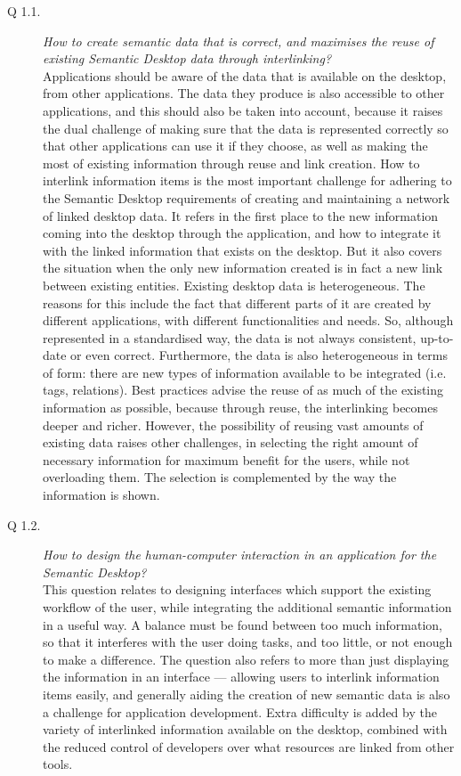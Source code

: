 \begin{description}
 \item[Q 1.1.] \emph{How to create semantic data that is correct, and maximises the reuse of existing Semantic Desktop data through interlinking?}\\
Applications should be aware of the data that is available on the desktop, from other applications. The data they produce is also accessible to other applications, and this should also be taken into account, because it raises the dual challenge of making sure that the data is represented correctly so that other applications can use it if they choose, as well as making the most of existing information through reuse and link creation. How to interlink information items is the most important challenge for adhering to the Semantic Desktop requirements of creating and maintaining a network of linked desktop data. It refers in the first place to the new information coming into the desktop through the application, and how to integrate it with the linked information that exists on the desktop. But it also covers the situation when the only new information created is in fact a new link between existing entities. 
Existing desktop data is heterogeneous. The reasons for this include the fact that different parts of it are created by different applications, with different functionalities and needs. So, although represented in a standardised way, the data is not always consistent, up-to-date or even correct. Furthermore, the data is also heterogeneous in terms of form: there are new types of information available to be integrated (i.e. tags, relations). Best practices advise the reuse of as much of the existing information as possible, because through reuse, the interlinking becomes deeper and richer. However, the possibility of reusing vast amounts of existing data raises other challenges, in selecting the right amount of necessary information for maximum benefit for the users, while not overloading them. The selection is complemented by the way the information is shown.
 \item[Q 1.2.] \emph{How to design the human-computer interaction in an application for the Semantic Desktop?}\\
This question relates to designing interfaces which support the existing workflow of the user, while integrating the additional semantic information in a useful way. A balance must be found between too much information, so that it interferes with the user doing tasks, and too little, or not enough to make a difference. The question also refers to more than just displaying the information in an interface --- allowing users to interlink information items easily, and generally aiding the creation of new semantic data is also a challenge for application development. Extra difficulty is added by the variety of interlinked information available on the desktop, combined with the reduced control of developers over what resources are linked from other tools.

\end{description}
